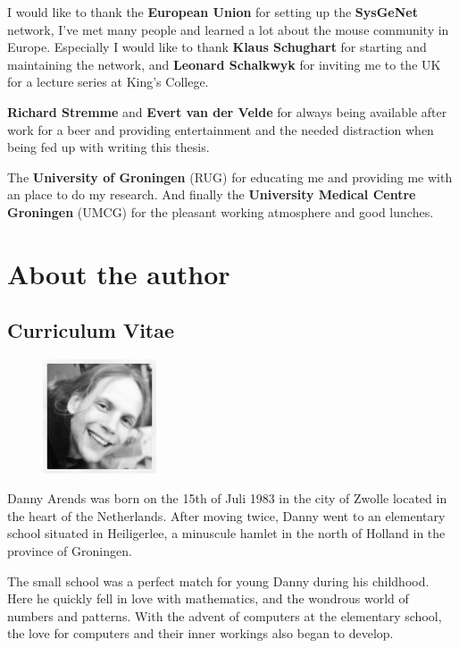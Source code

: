 I would like to thank the {\bf European Union} for setting up the {\bf SysGeNet} network, I've met 
many people and learned a lot about the mouse community in Europe. Especially I would like to thank 
{\bf Klaus Schughart} for starting and maintaining the network, and {\bf Leonard Schalkwyk} for 
inviting me to the UK for a lecture series at King's College.

{\bf Richard Stremme} and {\bf Evert van der Velde} for always being available after work for a beer and providing
entertainment and the needed distraction when being fed up with writing this thesis.

The {\bf University of Groningen} (RUG) for educating me and providing me with an place to do my research. And 
finally the {\bf University Medical Centre Groningen} (UMCG) for the pleasant working atmosphere and good lunches.

\newpage

\section*{About the author}
\subsection*{Curriculum Vitae}

\begin{figure}
  \centering
  \includegraphics[width=0.3\textwidth]{eps/image_6_1.eps}
\end{figure}

Danny Arends was born on the 15th of Juli 1983 in the city of Zwolle located in the heart 
of the Netherlands. After moving twice, Danny went to an elementary school situated in 
Heiligerlee, a minuscule hamlet in the north of Holland in the province of Groningen. 

The small school was a perfect match for young Danny during his childhood. Here he quickly 
fell in love with mathematics, and the wondrous world of numbers and patterns. With the 
advent of computers at the elementary school, the love for computers and their inner 
workings also began to develop.

